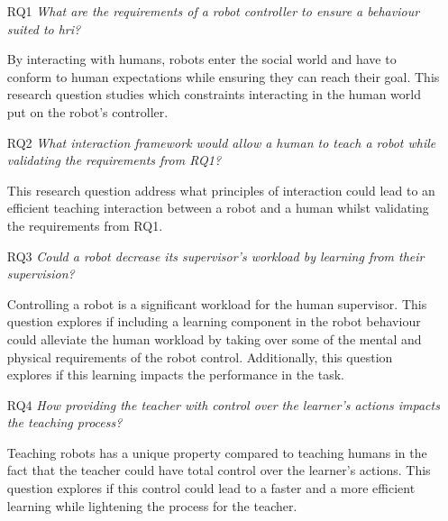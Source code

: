 \begin{itemize}
	\item [RQ1] \emph{What are the requirements of a robot controller to ensure a behaviour suited to \gls{hri}?} 
	
		By interacting with humans, robots enter the social world and have to conform to human expectations while ensuring they can reach their goal. This research question studies which constraints interacting in the human world put on the robot's controller. 
		
    \item [RQ2] \emph{What interaction framework would allow a human to teach a robot while validating the requirements from RQ1?}
    
    	This research question address what principles of interaction could lead to an efficient teaching interaction between a robot and a human whilst validating the requirements from RQ1. 
    	
    \item [RQ3] \emph{Could a robot decrease its supervisor's workload by learning from their supervision?}
    
        Controlling a robot is a significant workload for the human supervisor. This question explores if including a learning component in the robot behaviour could alleviate the human workload by taking over some of the mental and physical requirements of the robot control. Additionally, this question explores if this learning impacts the performance in the task.
    
    \item [RQ4] \emph{How providing the teacher with control over the learner's actions impacts the teaching process?} 
    
    	Teaching robots has a unique property compared to teaching humans in the fact that the teacher could have total control over the learner's actions. This question explores if this control could lead to a faster and a more efficient learning while lightening the process for the teacher.


\end{itemize}
